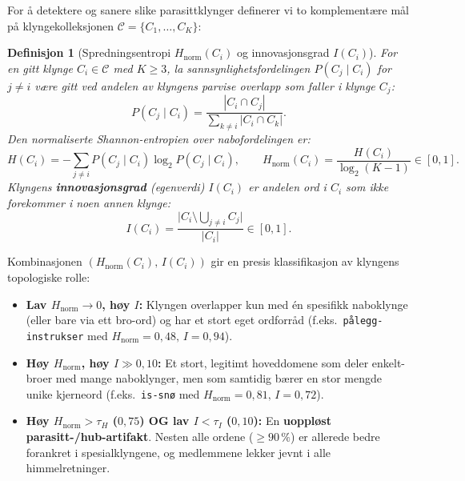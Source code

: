 \documentclass[11pt,a4paper]{article}
\newtheorem{definition}{Definisjon}
\begin{document}
For å detektere og sanere slike parasittklynger definerer vi to komplementære mål på klyngekolleksjonen $\mathcal{C} = \{C_1, \dots, C_K\}$:

\begin{definition}[Spredningsentropi $H_{\text{norm}}(C_i)$ og innovasjonsgrad $I(C_i)$]
For en gitt klynge $C_i \in \mathcal{C}$ med $K \ge 3$, la sannsynlighetsfordelingen $P(C_j \mid C_i)$ for $j \ne i$ være gitt ved andelen av klyngens parvise overlapp som faller i klynge $C_j$:
\begin{equation}
  P(C_j \mid C_i) = \frac{|C_i \cap C_j|}{\sum_{k \ne i} |C_i \cap C_k|}.
\end{equation}
Den normaliserte Shannon-entropien over nabofordelingen er:
\begin{equation}
  H(C_i) = -\sum_{j \ne i} P(C_j \mid C_i) \log_2 P(C_j \mid C_i), \qquad
  H_{\text{norm}}(C_i) = \frac{H(C_i)}{\log_2(K - 1)} \in [0, 1].
\end{equation}
Klyngens \textbf{innovasjonsgrad} (egenverdi) $I(C_i)$ er andelen ord i $C_i$ som ikke forekommer i noen annen klynge:
\begin{equation}
  I(C_i) = \frac{\big|C_i \setminus \bigcup_{j \ne i} C_j\big|}{|C_i|} \in [0, 1].
\end{equation}
\end{definition}

Kombinasjonen $(H_{\text{norm}}(C_i),\, I(C_i))$ gir en presis klassifikasjon av klyngens topologiske rolle:
\begin{itemize}
  \item \textbf{Lav $H_{\text{norm}} \to 0$, høy $I$:} Klyngen overlapper kun med én spesifikk naboklynge (eller bare via ett bro-ord) og har et stort eget ordforråd (f.eks.\ \texttt{pålegg-instrukser} med $H_{\text{norm}} = 0{,}48,\, I = 0{,}94$).
  \item \textbf{Høy $H_{\text{norm}}$, høy $I \gg 0{,}10$:} Et stort, legitimt hoveddomene som deler enkelt-broer med mange naboklynger, men som samtidig bærer en stor mengde unike kjerneord (f.eks.\ \texttt{is-snø} med $H_{\text{norm}} = 0{,}81,\, I = 0{,}72$).
  \item \textbf{Høy $H_{\text{norm}} > \tau_H$ ($0{,}75$) OG lav $I < \tau_I$ ($0{,}10$):} En \textbf{uoppløst parasitt-/hub-artifakt}. Nesten alle ordene ($\ge 90\,\%$) er allerede bedre forankret i spesialklyngene, og medlemmene lekker jevnt i alle himmelretninger.
\end{itemize}
\end{document}
